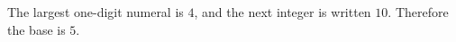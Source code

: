 The largest one-digit numeral is $4$, and the next integer is written $10$. Therefore the base is $\boxed5$.
